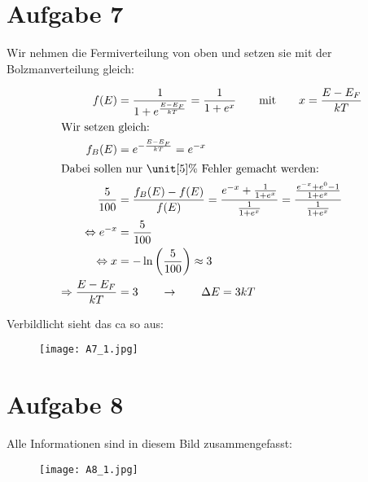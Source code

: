 \section{Aufgabe 7}

Wir nehmen die Fermiverteilung von oben und setzen sie mit der Bolzmanverteilung gleich:

\begin{align*}
f(E) &= \frac{1}{1 + e^{\frac{E - E_F}{kT}}} = \frac{1}{1 + e^x} \qquad \text{mit} \qquad x = \frac{E - E_F}{kT} \\
\intertext{Wir setzen gleich:}
f_B(E) &= e^{- \frac{E - E_F}{kT}} = e^{-x} \\
\intertext{Dabei sollen nur $\unit[5]{\%}$ Fehler gemacht werden:}
\frac{5}{100} &= \frac{f_B(E) - f(E)}{f(E)} = \frac{e^{-x} + \frac{1}{1 + e^x}}{\frac{1}{1 + e^x}} = \frac{\frac{e^{-x} + e^0 - 1}{1 + e^x}}{\frac{1}{1 + e^x}} \\
\Leftrightarrow e^{-x} &= \frac{5}{100} \\
\Leftrightarrow x &= - \ln\left( \frac{5}{100} \right) \approx 3 \\
\Rightarrow \frac{E - E_F}{kT} &= 3 \qquad \rightarrow \qquad \Delta E = 3kT
\end{align*}


Verbildlicht sieht das ca so aus:

\begin{figure}[h]
	\centering
	\texttt{[image: A7\_1.jpg]}
\end{figure}


\newpage

\section{Aufgabe 8}

Alle Informationen sind in diesem Bild zusammengefasst:

\begin{figure}[h]
	\centering
	\texttt{[image: A8\_1.jpg]}
\end{figure}











